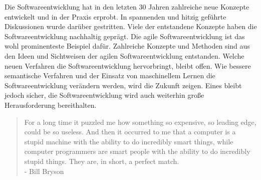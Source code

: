Die Softwareentwicklung hat in den letzten 30 Jahren zahlreiche neue Konzepte entwickelt und in der Praxis erprobt. In spannenden und hitzig geführte Diskussionen wurde darüber gestritten. Viele der entstandene Konzepte haben die Softwareentwicklung nachhaltig geprägt. Die agile Softwareentwicklung ist das wohl prominenteste Beispiel dafür. Zahlreiche Konzepte und Methoden sind aus den Ideen und Sichtweisen der agilen Softwareentwicklung entstanden. Welche neuen Verfahren die Softwareentwicklung hervorbringt, bleibt offen. Wie bessere semantische Verfahren und der Einsatz von maschinellem Lernen die Softwareentwicklung verändern werden, wird die Zukunft zeigen. Eines bleibt jedoch sicher, die Softwareentwicklung wird auch weiterhin große Herausforderung bereithalten.

\blockquote {For a long time it puzzled me how something so expensive, so leading edge, could be so useless. And then it occurred to me that a computer is a stupid machine with the ability to do incredibly smart things, while computer programmers are smart people with the ability to do incredibly stupid things. They are, in short, a perfect match. \\- Bill Bryson}
